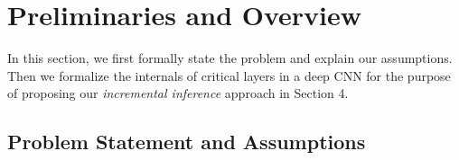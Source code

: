 \section{Preliminaries and Overview}\label{sec:preliminaries}
In this section, we first formally state the problem and explain our assumptions.
Then we formalize the internals of critical layers in a deep CNN for the purpose of proposing our \textit{incremental inference} approach in Section 4.

\subsection{Problem Statement and Assumptions}\label{sec:problem}


